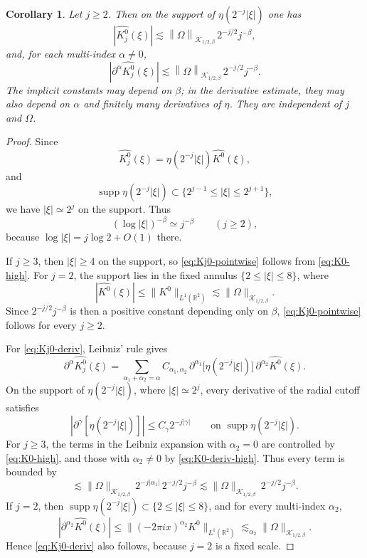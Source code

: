 \documentclass[11pt]{amsart}
\newtheorem{corollary}[definition]{Corollary}
\theoremstyle{remark}
\numberwithin{equation}{section}
\newcommand{\R}{\mathbb R}
\newcommand{\cK}{\mathcal K}
\newcommand{\norm}[1]{\left\lVert #1\right\rVert}
\newcommand{\abs}[1]{\left\lvert #1\right\rvert}
\newcommand{\supp}{\operatorname{supp}}
\newcommand{\p}{\partial}
\begin{document}
	\begin{corollary}\label{cor:Kj0-high}
		Let \(j\ge2\). Then on the support of \(\eta(2^{-j}\abs{\xi})\) one has
		\begin{equation}\label{eq:Kj0-pointwise}
			\abs{\widehat{K_j^0}(\xi)}
			\lesssim
			\norm{\Omega}_{\cK_{1/2,\beta}}\,2^{-j/2}j^{-\beta},
		\end{equation}
		and, for each multi-index \(\alpha\neq0\),
		\begin{equation}\label{eq:Kj0-deriv}
			\abs{\p^\alpha \widehat{K_j^0}(\xi)}
			\lesssim
			\norm{\Omega}_{\cK_{1/2,\beta}}\,2^{-j/2}j^{-\beta}.
		\end{equation}
		The implicit constants may depend on \(\beta\); in the derivative estimate,
		they may also depend on \(\alpha\) and finitely many derivatives of \(\eta\).
		They are independent of \(j\) and \(\Omega\).
	\end{corollary}
	
	\begin{proof}
		Since
		\[
		\widehat{K_j^0}(\xi)=\eta(2^{-j}\abs{\xi})\widehat{K^0}(\xi),
		\]
		and
		\[
		\supp\eta(2^{-j}\abs{\xi})\subset\{2^{j-1}\le\abs{\xi}\le2^{j+1}\},
		\]
		we have \(\abs{\xi}\simeq 2^j\) on the support. Thus
		\[
		(\log\abs{\xi})^{-\beta}\simeq j^{-\beta}
		\qquad (j\ge2),
		\]
		because \(\log\abs{\xi}=j\log 2+O(1)\) there.
		
		If \(j\ge3\), then \(\abs{\xi}\ge4\) on the support, so
		\eqref{eq:Kj0-pointwise} follows from \eqref{eq:K0-high}. For \(j=2\), the
		support lies in the fixed annulus \(\{2\le \abs{\xi}\le 8\}\), where
		\[
		|\widehat{K^0}(\xi)|
		\le \|K^0\|_{L^1(\R^2)}
		\lesssim \|\Omega\|_{\cK_{1/2,\beta}}.
		\]
		Since \(2^{-j/2}j^{-\beta}\) is then a positive constant depending only on
		\(\beta\), \eqref{eq:Kj0-pointwise} follows for every \(j\ge2\).
		
		For \eqref{eq:Kj0-deriv}, Leibniz' rule gives
		\[
		\p^\alpha\widehat{K_j^0}(\xi)
		=
		\sum_{\alpha_1+\alpha_2=\alpha}
		C_{\alpha_1,\alpha_2}\,
		\p^{\alpha_1}\bigl[\eta(2^{-j}\abs{\xi})\bigr]\,
		\p^{\alpha_2}\widehat{K^0}(\xi).
		\]
		On the support of \(\eta(2^{-j}|\xi|)\), where \(|\xi|\simeq 2^j\), every
		derivative of the radial cutoff satisfies
		\[
		\abs{\p^\gamma[\eta(2^{-j}\abs{\xi})]}
		\le C_\gamma 2^{-j\abs{\gamma}}
		\qquad \text{on }\supp\eta(2^{-j}\abs{\xi}).
		\]
		For \(j\ge3\), the terms in the Leibniz expansion with \(\alpha_2=0\) are
		controlled by \eqref{eq:K0-high}, and those with \(\alpha_2\ne0\) by
		\eqref{eq:K0-deriv-high}. Thus every term is bounded by
		\[
		\lesssim
		\|\Omega\|_{\cK_{1/2,\beta}}\,2^{-j|\alpha_1|}\,2^{-j/2}j^{-\beta}
		\lesssim
		\|\Omega\|_{\cK_{1/2,\beta}}\,2^{-j/2}j^{-\beta}.
		\]
		If \(j=2\), then \(\supp\eta(2^{-j}|\xi|)\subset\{2\le |\xi|\le 8\}\), and for
		every multi-index \(\alpha_2\),
		\[
		|\partial^{\alpha_2}\widehat{K^0}(\xi)|
		\le \|(-2\pi i x)^{\alpha_2}K^0\|_{L^1(\R^2)}
		\lesssim_{\alpha_2}\|\Omega\|_{\cK_{1/2,\beta}}.
		\]
		Hence \eqref{eq:Kj0-deriv} also follows, because \(j=2\) is a fixed scale.
	\end{proof}
	
\end{document}
